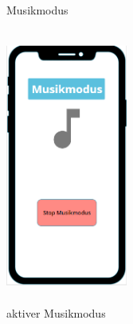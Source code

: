 \documentclass[a4paper,12pt]{article}
\begin{document}
\begin{figure}[ht!]
\begin{minipage}{0.4\textwidth}
			\caption{Musikmodus}
		\end{minipage}
		\hfill
		\begin{minipage}{0.4\textwidth}
			\includegraphics[width=4cm,height=9cm]{./Benutzeroberflaeche/Musikmodus_aktiv.png}
			\caption{aktiver Musikmodus}
			
		\end{minipage}
\end{figure}
\end{document}
